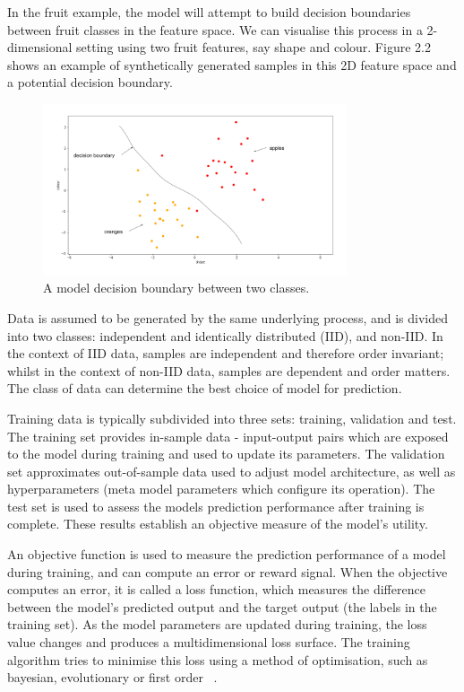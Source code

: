 \noindent In the fruit example, the model will attempt to build decision boundaries between fruit classes in the feature space. We can visualise this process in a 2-dimensional setting using two fruit features, say shape and colour. Figure 2.2 shows an example of synthetically generated samples in this 2D feature space and a potential decision boundary.

\begin{figure}[H]
   	\centering
    	\includegraphics[width=0.8\textwidth]{oranges_and_apples_decision_boundary}
	\caption{A model decision boundary between two classes.}
\end{figure}

\noindent Data is assumed to be generated by the same underlying process, and is divided into two classes: independent and identically distributed (IID), and non-IID. In the context of IID data, samples are independent and therefore order invariant; whilst in the context of non-IID data, samples are dependent and order matters. The class of data can determine the best choice of model for prediction. \par

\noindent Training data is typically subdivided into three sets: training, validation and test. The training set provides in-sample data - input-output pairs which are exposed to the model during training and used to update its parameters. The validation set approximates out-of-sample data used to adjust model architecture, as well as hyperparameters (meta model parameters which configure its operation). The test set is used to assess the models prediction performance after training is complete. These results establish an objective measure of the model's utility.  \par

\noindent An objective function is used to measure the prediction performance of a model during training, and can compute an error or reward signal. When the objective computes an error, it is called a loss function, which measures the difference between the model's predicted output and the target output (the labels in the training set). As the model parameters are updated during training, the loss value changes and produces a multidimensional loss surface. The training algorithm tries to minimise this loss using a method of optimisation, such as bayesian, evolutionary or first order \unskip ~\citep{hastie2009elements, bishop2006pattern, murphy2012machine}. \par

